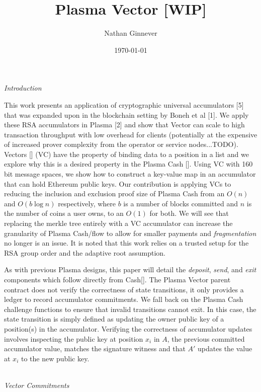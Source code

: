\documentclass[11pt]{article}
\title{Plasma Vector [WIP]}
\author{Nathan Ginnever}
\date{\today}
\begin{document}
\maketitle
\centerline{\textit{Introduction}}

This work presents an application of cryptographic universal accumulators [5] that was expanded upon in the blockchain setting by Boneh et al [1]. We apply these RSA accumulators in Plasma [2] and show that Vector can scale to high transaction throughput with low overhead for clients (potentially at the expensive of increased prover complexity from the operator or service nodes...TODO). Vectors [] (VC) have the property of binding data to a position in a list and we explore why this is a desired property in the Plasma Cash []. Using VC with 160 bit message spaces, we show how to construct a key-value map in an accumulator that can hold Ethereum public keys. Our contribution is applying VCs to reducing the inclusion and exclusion proof size of Plasma Cash from an $O(n)$ and $O(b \log n)$ respectively, where $b$ is a number of blocks committed and $n$ is the number of coins a user owns, to an $O(1)$ for both. We will see that replacing the merkle tree entirely with a VC accumulator can increase the granularity of Plasma Cash/flow to allow for smaller payments and \textit{fragmentation} no longer is an issue. It is noted that this work relies on a trusted setup for the RSA group order and the adaptive root assumption. 

As with previous Plasma designs, this paper will detail the \textit{deposit}, \textit{send}, and \textit{exit} components which follow directly from Cash[]. The Plasma Vector parent contract does not verify the correctness of state transitions, it only provides a ledger to record accumulator commitments. We fall back on the Plasma Cash challenge functions to ensure that invalid transitions cannot exit. In this case, the state transition is simply defined as updating the owner public key of a position(s) in the accumulator. Verifying the correctness of accumulator updates involves inspecting the public key at position $x_i$ in $A$, the previous committed accumulator value, matches the signature witness and that $A'$ updates the value at $x_i$ to the new public key. 
\\
\\

\centerline{\textit{Vector Commitments}}
\end{document}
